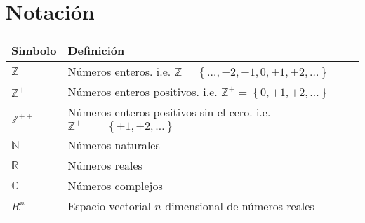 \chapter*{Notación}


\begin{table}[ht!]
    \begin{center}
        \begin{tabularx}{\textwidth}{|l|X|}
            \hline
            \textbf{Simbolo}                                  & \textbf{Definición}                                                                                                         \\
            \hline
            $ \mathbb{Z} $                                    & Números enteros. \newline i.e. $ \scriptstyle{ \mathbb{Z}  = \left\{ \ldots, -2, -1, 0, +1, +2, \ldots \right\} } $         \\
            $ \mathbb{Z}^{+} $                                & Números enteros positivos. \newline i.e. $ \scriptstyle{ \mathbb{Z}^{+}  = \left\{ 0, +1, +2, \ldots \right\} } $           \\
            $ \mathbb{Z}^{++} $                               & Números enteros positivos sin el cero. \newline i.e. $ \scriptstyle{ \mathbb{Z}^{++}  = \left\{ +1, +2, \ldots \right\} } $ \\
            $ \mathbb{N} $                                    & Números naturales                                                                                                           \\
            $ \mathbb{R} $                                    & Números reales                                                                                                              \\
            $ \mathbb{C} $                                    & Números complejos                                                                                                           \\
            $ R^{n} $                                         & Espacio vectorial $n$-dimensional de números reales                                                                         \\


\end{tabularx}
\end{center}
\end{table}
